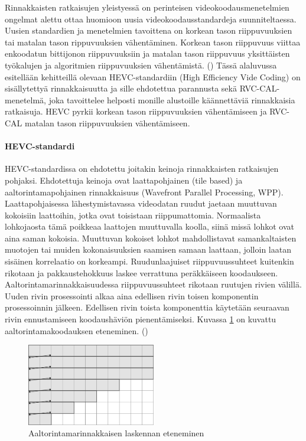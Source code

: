 Rinnakkaisten ratkaisujen yleistyessä on perinteisen videokoodausmenetelmien
ongelmat alettu ottaa huomioon uusia
videokoodausstandardeja suunniteltaessa. Uusien standardien ja menetelmien tavoittena on korkean
tason riippuvuuksien tai matalan tason rippuvuuksien vähentäminen. Korkean
tason riippuvuus viittaa enkoodatun bittijonon riippuvuuksiin ja matalan
tason riippuvuus yksittäisten työkalujen ja algoritmien riippuvuuksien
vähentämistä. (\citealt{choi}) Tässä alaluvussa esitellään kehitteillä
olevaan HEVC-standardiin (High Efficiency Vide Coding) on sisällytettyä rinnakkaisuutta ja sille ehdotettua
parannusta sekä RVC-CAL-menetelmä, joka tavoittelee helposti monille alustoille
käännettäviä rinnakkaisia ratkaisuja. HEVC pyrkii korkean tason riippuvuuksien
vähentämiseen ja RVC-CAL matalan tason riippuvuuksien vähentämiseen.

\setcounter{secnumdepth}{5}

\paragraph{HEVC-standardi}
HEVC-standardissa on ehdotettu joitakin keinoja rinnakkaisten
ratkaisujen pohjaksi. Ehdotettuja keinoja ovat laattapohjainen (tile based) ja
aaltorintamapohjainen rinnakkaisuus (Wavefront Parallel Processing, WPP).
Laattapohjaisessa lähestymistavassa videodatan ruudut jaetaan muuttuvan
kokoisiin laattoihin, jotka ovat toisistaan riippumattomia. Normaalista
lohkojaosta tämä poikkeaa laattojen muuttuvalla koolla, siinä missä lohkot
ovat aina saman kokoisia. Muuttuvan kokoiset lohkot mahdollistavat
samankaltaisten muotojen tai muiden kokonaisuuksien saamisen samaan laattaan,
jolloin laatan sisäinen korrelaatio on korkeampi. Ruudunlaajuiset
riippuvuussuhteet kuitenkin rikotaan ja pakkaustehokkuus laskee verrattuna
peräkkäiseen koodaukseen. Aaltorintamarinnakkaisuudessa riippuvuussuhteet
rikotaan ruutujen rivien välillä. Uuden rivin prosessointi alkaa aina edellisen
rivin toisen komponentin prosessoinnin jälkeen. Edellisen rivin toista
komponenttia käytetään seuraavan rivin ennustamiseen koodaushäviön
pienentämiseksi. Kuvassa \ref{fig:wpp} on kuvattu aaltorintamakoodauksen
eteneminen. (\citealt{chi})

\begin{figure}[ht]
	\centering
	\includegraphics[width=0.5\textwidth]{WPP.jpg}
	\caption{Aaltorintamarinnakkaisen laskennan eteneminen}
	\label{fig:wpp}
\end{figure}

